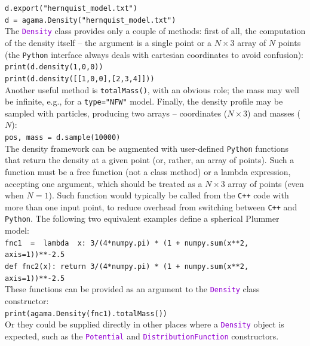 \documentclass[12pt]{article}
\newcommand{\Cpp}  {\texttt{C++}\xspace}
\newcommand{\Python}{\texttt{Python}\xspace}
\newcommand{\ttt}[1]{\textcolor{darkviolet}{\texttt{#1}}}
\newcommand{\ppp}[1]{\textcolor{darkolive} {\texttt{#1}}}
\begin{document}
\texttt{d.export("hernquist_model.txt")}\\
\texttt{d = agama.Density("hernquist_model.txt")}\\[2mm]
The \ttt{Density} class provides only a couple of methods: first of all, the computation of the density itself -- the argument is a single point or a $N\times3$ array of $N$ points (the \Python interface always deals with cartesian coordinates to avoid confusion):\\
\texttt{print(d.density(1,0,0))}\\
\texttt{print(d.density([[1,0,0],[2,3,4]]))}\\[2mm]
Another useful method is \texttt{totalMass()}, with an obvious role; the mass may well be infinite, e.g., for a \ppp{type="NFW"} model.
Finally, the density profile may be sampled with particles, producing two arrays -- coordinates ($N\times3$) and masses ($N$): \\
\texttt{pos, mass = d.sample(10000)}\\[2mm]
The density framework can be augmented with user-defined \Python functions that return the density at a given point (or, rather, an array of points). Such a function must be a free function (not a class method) or a lambda expression, accepting one argument, which should be treated as a $N\times3$ array of points (even when $N=1$). Such function would typically be called from the \Cpp code with more than one input point, to reduce overhead from switching between \Cpp and \Python. The following two equivalent examples define a spherical Plummer model:\\
\texttt{fnc1~~=~~lambda~~x:  3/(4*numpy.pi) * (1 + numpy.sum(x**2, axis=1))**-2.5}\\
\texttt{def fnc2(x):  return 3/(4*numpy.pi) * (1 + numpy.sum(x**2, axis=1))**-2.5}\\
These functions can be provided as an argument to the \ttt{Density} class constructor:\\
\texttt{print(agama.Density(fnc1).totalMass())}\\
Or they could be supplied directly in other places where a \ttt{Density} object is expected, such as the \ttt{Potential} and \ttt{DistributionFunction} constructors.
\end{document}
